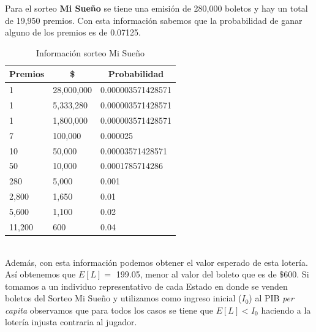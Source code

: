 \newpage
Para el sorteo \textbf{Mi Sueño} se tiene una emisión de 280,000 boletos y hay un total de 19,950 premios. Con esta información sabemos que la probabilidad de ganar alguno de los premios es de 0.07125. 

\begin{table}[H]
\centering
\caption{Información sorteo Mi Sueño}
\label{tab:misuen}
\begin{tabular}{@{}lll@{}}
\toprule
\multicolumn{1}{c}{Premios} & \multicolumn{1}{c}{\$} & \multicolumn{1}{c}{Probabilidad} \\ \midrule
1                           & 28,000,000               & 0.000003571428571        \\
1                           & 5,333,280                & 0.000003571428571        \\
1                           & 1,800,000                & 0.000003571428571        \\
7                           & 100,000                 & 0.000025                 \\
10                          & 50,000                  & 0.00003571428571         \\
50                          & 10,000                  & 0.0001785714286          \\
280                         & 5,000                   & 0.001                    \\
2,800                        & 1,650                   & 0.01                     \\
5,600                        & 1,100                   & 0.02                     \\
11,200                       & 600                    & 0.04                     \\ \bottomrule
\end{tabular}
\end{table} \\

Además, con esta información podemos obtener el valor esperado de esta lotería. Así obtenemos que $E[L] = $ 199.05, menor al valor del boleto que es de $\$ 600$. Si tomamos a un individuo representativo de cada Estado en donde se venden boletos del Sorteo Mi Sueño y utilizamos como ingreso inicial ($I_0$) al PIB \textit{per capita} observamos que para todos los casos se tiene que $E[L] < I_0$ haciendo a la lotería injusta contraria al jugador. \\

\newpage

